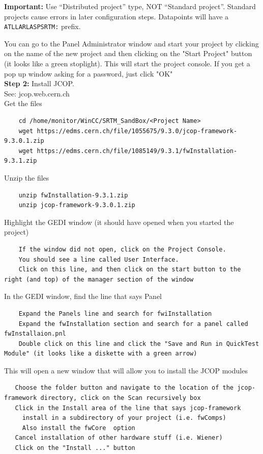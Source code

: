 \documentclass[11pt,a4paper]{article}
\begin{document}
\begin{warningbox}
\textbf{Important:} Use ``Distributed project'' type, NOT ``Standard project''. Standard projects cause errors in later configuration steps. Datapoints will have a \texttt{ATLLARLASPSRTM:} prefix.
\end{warningbox}

You can go to the Panel Administrator window and start your project by clicking on the name of the new project and then clicking on the "Start Project" button (it looks like a green stoplight). This will start the project console. If you get a pop up window asking for a password, just click "OK"\\

\noindent\textbf{Step 2:} Install JCOP.\\

\noindent See: jcop.web.cern.ch\\

\noindent Get the files\\
    \begin{lstlisting}
    cd /home/monitor/WinCC/SRTM_SandBox/<Project Name>
    wget https://edms.cern.ch/file/1055675/9.3.0/jcop-framework-9.3.0.1.zip
    wget https://edms.cern.ch/file/1085149/9.3.1/fwInstallation-9.3.1.zip
    \end{lstlisting}
  \noindent Unzip the files
    \begin{lstlisting}
    unzip fwInstallation-9.3.1.zip
    unzip jcop-framework-9.3.0.1.zip
    \end{lstlisting}

\noindent Highlight the GEDI window (it should have opened when you started the project)
    \begin{lstlisting}
    If the window did not open, click on the Project Console.
    You should see a line called User Interface.
    Click on this line, and then click on the start button to the right (and top) of the manager section of the window
    \end{lstlisting}

\noindent In the GEDI window, find the line that says Panel
    \begin{lstlisting}
    Expand the Panels line and search for fwiInstallation
    Expand the fwInstallation section and search for a panel called fwInstallaion.pnl
    Double click on this line and click the "Save and Run in QuickTest Module" (it looks like a diskette with a green arrow)
    \end{lstlisting}
\noindent This will open a new window that will allow you to install the JCOP modules
    \begin{lstlisting}
   Choose the folder button and navigate to the location of the jcop-framework directory, click on the Scan recursively box
   Click in the Install area of the line that says jcop-framework
     install in a subdirectory of your project (i.e. fwComps)
     Also install the fwCore  option
   Cancel installation of other hardware stuff (i.e. Wiener)
   Click on the "Install ..." button  
   \end{lstlisting}
\end{document}
